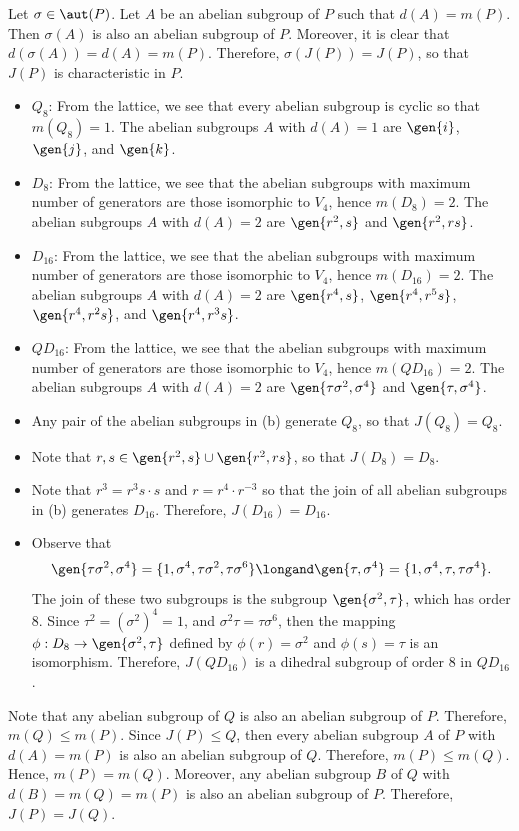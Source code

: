 \begin{solalph}
	\item Let $\sigma \in \aut(P)$. Let $A$ be an abelian subgroup of $P$ such that $d(A) = m(P)$. Then $\sigma(A)$ is also an abelian subgroup of $P$. Moreover, it is clear that $d(\sigma(A)) = d(A) = m(P)$. Therefore, $\sigma(J(P)) = J(P)$, so that $J(P)$ is characteristic in $P$.
	\item 
	\begin{itemize}
		\item $Q_8$: From the lattice, we see that every abelian subgroup is cyclic so that $m(Q_8) = 1$. The abelian subgroups $A$ with $d(A) = 1$ are $\gen{i}$, $\gen{j}$, and $\gen{k}$.
		\item $D_8$: From the lattice, we see that the abelian subgroups with maximum number of generators are those isomorphic to $V_4$, hence $m(D_8) = 2$. The abelian subgroups $A$ with $d(A) = 2$ are $\gen{r^2, s}$ and $\gen{r^2, rs}$.
		\item $D_{16}$: From the lattice, we see that the abelian subgroups with maximum number of generators are those isomorphic to $V_4$, hence $m(D_{16}) = 2$. The abelian subgroups $A$ with $d(A) = 2$ are $\gen{r^4, s}$, $\gen{r^4, r^5s}$, $\gen{r^4, r^2s}$, and $\gen{r^4, r^3s}$.
		\item $QD_{16}$: From the lattice, we see that the abelian subgroups with maximum number of generators are those isomorphic to $V_4$, hence $m(QD_{16}) = 2$. The abelian subgroups $A$ with $d(A) = 2$ are $\gen{\tau\sigma^2, \sigma^4}$ and $\gen{\tau, \sigma^4}$.
	\end{itemize}
	\item 
	\begin{itemize}
		\item Any pair of the abelian subgroups in (b) generate $Q_8$, so that $J(Q_8) = Q_8$.
		\item Note that $r, s \in \gen{r^2, s} \cup \gen{r^2, rs}$, so that $J(D_8) = D_8$.
		\item Note that $r^3 = r^3s \cdot s$ and $r = r^4 \cdot r^{-3}$ so that the join of all abelian subgroups in (b) generates $D_{16}$. Therefore, $J(D_{16}) = D_{16}$.
		\item Observe that
		\[\gen{\tau\sigma^2, \sigma^4} = \{1, \sigma^4, \tau\sigma^2, \tau\sigma^6\} \longand \gen{\tau, \sigma^4} = \{1, \sigma^4, \tau, \tau\sigma^4\}.\]
		The join of these two subgroups is the subgroup $\gen{\sigma^2, \tau}$, which has order 8. Since $\tau^2 = (\sigma^2)^4 = 1$, and $\sigma^2\tau = \tau\sigma^6$, then the mapping $\phi : D_8 \to \gen{\sigma^2, \tau}$ defined by $\phi(r) = \sigma^2$ and $\phi(s) = \tau$ is an isomorphism. Therefore, $J(QD_{16})$ is a dihedral subgroup of order 8 in $QD_{16}$.
	\end{itemize}
	\item Note that any abelian subgroup of $Q$ is also an abelian subgroup of $P$. Therefore, $m(Q) \leq m(P)$. Since $J(P) \leq Q$, then every abelian subgroup $A$ of $P$ with $d(A) = m(P)$ is also an abelian subgroup of $Q$. Therefore, $m(P) \leq m(Q)$. Hence, $m(P) = m(Q)$. Moreover, any abelian subgroup $B$ of $Q$ with $d(B) = m(Q) = m(P)$ is also an abelian subgroup of $P$. Therefore, $J(P) = J(Q)$.
	

\end{solalph}
